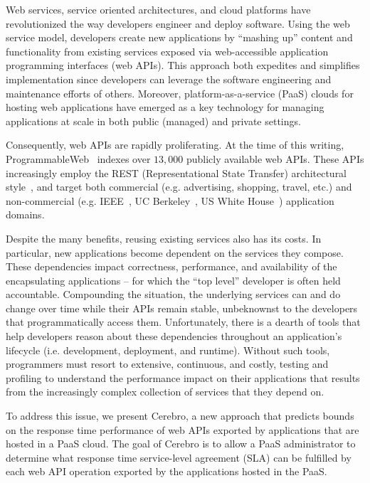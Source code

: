 Web services, service oriented architectures, and cloud platforms have
revolutionized the way developers engineer and deploy software.
Using the web service model, developers create new applications
by ``mashing up'' content and functionality 
from existing services 
exposed via web-accessible application programming interfaces (web APIs).
This approach both expedites and simplifies implementation since 
developers can leverage the 
software engineering and maintenance efforts of others.
Moreover, platform-as-a-service (PaaS) clouds
for hosting web applications have emerged as a key
technology for managing applications at scale in both public (managed) and 
private settings.  

Consequently, web APIs are rapidly 
proliferating.  At the time of this writing, 
ProgrammableWeb~\cite{pweb} indexes over $13,000$
publicly available web APIs.
These APIs increasingly employ the REST (Representational State Transfer) 
architectural style~\cite{Fielding:2000:ASD:932295}, and target both
commercial (e.g. advertising, shopping, travel, etc.) and non-commercial
(e.g. IEEE~\cite{ieeeapis}, UC Berkeley~\cite{ucbapis}, US White
House~\cite{whitehouseapis}) application domains.

Despite the many benefits, reusing existing services also has its costs.  
In particular, new applications become dependent on the 
services they compose.  These dependencies
impact correctness, performance, and availability of the encapsulating 
applications -- for which the ``top level'' developer is often held accountable.  
Compounding the situation, the underlying services can and do change over time
while their APIs remain stable,
unbeknownst to the developers that programmatically access them.
Unfortunately, there is a dearth of tools that help developers reason about these 
dependencies throughout an application's 
lifecycle (i.e. development, deployment, and runtime).  Without such tools, 
programmers must resort to extensive, continuous, and costly, testing and profiling 
to understand the performance impact on their applications
that results from the increasingly complex collection of
services that they depend on.

To address this issue, we present Cerebro, a new approach that
predicts bounds on 
the response time performance of web
APIs exported by applications that are hosted in a PaaS cloud.
The goal of Cerebro is to allow 
a PaaS administrator to determine what response time service-level agreement (SLA) can be
fulfilled by each web API operation exported by the applications
hosted in the PaaS.  

